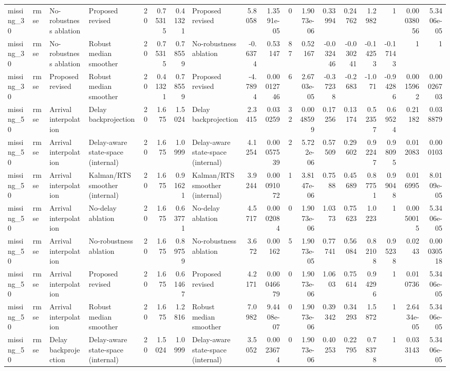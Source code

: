 \begin{table}[!htbp]
{\begin{tabular}{llllrrrlrrrrrrrrrr}
missing_30 & rmse & No-robustness ablation & Proposed revised & 20 & 0.75315 & 0.41321 & Proposed revised & 5.8058 & 1.3591e-05 & 0 & 1.9073e-06 & 0.33994 & 0.24762 & 1.2982 & 1 & 0.00038056 & 5.3406e-05 \\
missing_30 & rmse & No-robustness ablation & Robust median smoother & 20 & 0.75315 & 0.78559 & No-robustness ablation & -0.6374 & 0.53147 & 87 & 0.52167 & -0.032446 & -0.030241 & -0.14253 & -0.17143 & 1 & 1 \\
missing_30 & rmse & Proposed revised & Robust median smoother & 20 & 0.41321 & 0.78559 & Proposed revised & -4.7894 & 0.00012746 & 6 & 2.6703e-05 & -0.37238 & -0.2683 & -1.071 & -0.94286 & 0.0015962 & 0.00026703 \\
missing_50 & rmse & Arrival interpolation & Delay backprojection & 20 & 1.675 & 1.5024 & Delay backprojection & 2.3415 & 0.030259 & 32 & 0.0048599 & 0.17256 & 0.13174 & 0.52357 & 0.69524 & 0.21182 & 0.038879 \\
missing_50 & rmse & Arrival interpolation & Delay-aware state-space (internal) & 20 & 1.675 & 1.0999 & Delay-aware state-space (internal) & 4.1254 & 0.00057539 & 2 & 5.722e-06 & 0.57509 & 0.29602 & 0.92247 & 0.98095 & 0.012083 & 0.000103 \\
missing_50 & rmse & Arrival interpolation & Kalman/RTS smoother (internal) & 20 & 1.675 & 0.91621 & Kalman/RTS smoother (internal) & 3.9244 & 0.00091072 & 1 & 3.8147e-06 & 0.7588 & 0.45689 & 0.87751 & 0.99048 & 0.016995 & 8.0109e-05 \\
missing_50 & rmse & Arrival interpolation & No-delay ablation & 20 & 1.675 & 0.63771 & No-delay ablation & 4.5717 & 0.0002084 & 0 & 1.9073e-06 & 1.0373 & 0.75623 & 1.0223 & 1 & 0.0050015 & 5.3406e-05 \\
missing_50 & rmse & Arrival interpolation & No-robustness ablation & 20 & 1.675 & 0.89759 & No-robustness ablation & 3.672 & 0.00162 & 5 & 1.9073e-05 & 0.77741 & 0.56084 & 0.82108 & 0.95238 & 0.0243 & 0.00030518 \\
missing_50 & rmse & Arrival interpolation & Proposed revised & 20 & 1.675 & 0.61467 & Proposed revised & 4.2171 & 0.00046679 & 0 & 1.9073e-06 & 1.0603 & 0.75614 & 0.94296 & 1 & 0.010736 & 5.3406e-05 \\
missing_50 & rmse & Arrival interpolation & Robust median smoother & 20 & 1.675 & 1.2816 & Robust median smoother & 7.0982 & 9.4408e-07 & 0 & 1.9073e-06 & 0.39342 & 0.34293 & 1.5872 & 1 & 2.6434e-05 & 5.3406e-05 \\
missing_50 & rmse & Delay backprojection & Delay-aware state-space (internal) & 20 & 1.5024 & 1.0999 & Delay-aware state-space (internal) & 3.5052 & 0.0023674 & 0 & 1.9073e-06 & 0.40253 & 0.22795 & 0.78378 & 1 & 0.033143 & 5.3406e-05 \\

\end{tabular}}
\end{table}
